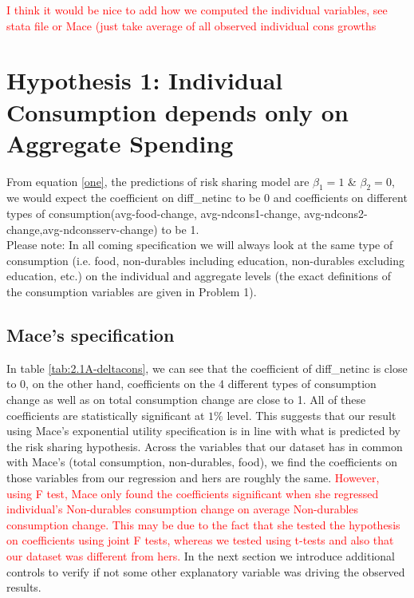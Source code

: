 \documentclass[12pt,a4paper]{article}
\begin{document}
\textcolor{red}{I think it would be nice to add how we computed the individual variables, see stata file or Mace (just take average of all observed individual cons growths}

\section*{Hypothesis 1: Individual Consumption depends only on Aggregate Spending}
From equation \eqref{one}, the predictions of risk sharing model are $\beta_1=1$ \& $\beta_2=0$, we would expect the coefficient on diff\_netinc to be 0 and coefficients on different types of consumption(avg-food-change, avg-ndcons1-change,  avg-ndcons2-change,avg-ndconsserv-change) to be 1. \\

Please note: In all coming specification we will always look at the same type of consumption (i.e. food, non-durables including education, non-durables excluding education, etc.) on the individual and aggregate levels (the exact definitions of the consumption variables are given in  Problem 1). 

\subsection*{Mace's specification}



In table \ref{tab:2.1A-deltacons}, we can see that the coefficient of diff\_netinc is close to 0, on the other hand, coefficients on the 4 different types of consumption change as well as on total consumption change are close to 1. All of these coefficients are statistically significant at $1\%$ level. This suggests that our result using Mace's exponential utility specification is in line with what is predicted by the risk sharing hypothesis. Across the variables that our dataset has in common with Mace's (total consumption, non-durables, food), we find the coefficients on those variables from our regression and hers are roughly the same. \textcolor{red}{However, using F test, Mace only found the coefficients significant when she regressed individual's Non-durables consumption change on average Non-durables consumption change. This may be due to the fact that she tested the hypothesis on coefficients using joint F tests, whereas we tested using t-tests and also that our dataset was different from hers.} In the next section we introduce additional controls to verify if not some other explanatory variable was driving the observed results.
\end{document}
